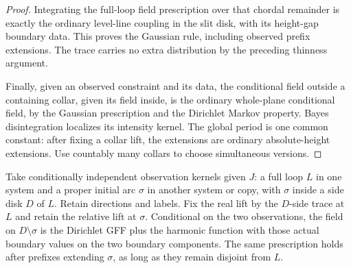 \begin{proof}
Integrating the full-loop field prescription over that chordal remainder is exactly the ordinary level-line coupling in the slit disk, with its height-gap boundary data.  This proves the Gaussian rule, including observed prefix extensions.  The trace carries no extra distribution by the preceding thinness argument.

Finally, given an observed constraint and its data, the conditional field outside a containing collar, given its field inside, is the ordinary whole-plane conditional field, by the Gaussian prescription and the Dirichlet Markov property.  Bayes disintegration localizes its intensity kernel.  The global period is one common constant: after fixing a collar lift, the extensions are ordinary absolute-height extensions.  Use countably many collars to choose simultaneous versions.
\end{proof}

\begin{lemma}\label{wall:product-gaussian}
Take conditionally independent observation kernels given $J$: a full loop $L$ in one system and a proper initial arc $\sigma$ in another system or copy, with $\sigma$ inside a side disk $D$ of $L$.  Retain directions and labels.  Fix the real lift by the $D$-side trace at $L$ and retain the relative lift at $\sigma$.  Conditional on the two observations, the field on $D\setminus\sigma$ is the Dirichlet GFF plus the harmonic function with those actual boundary values on the two boundary components.  The same prescription holds after prefixes extending $\sigma$, as long as they remain disjoint from $L$.
\end{lemma}


